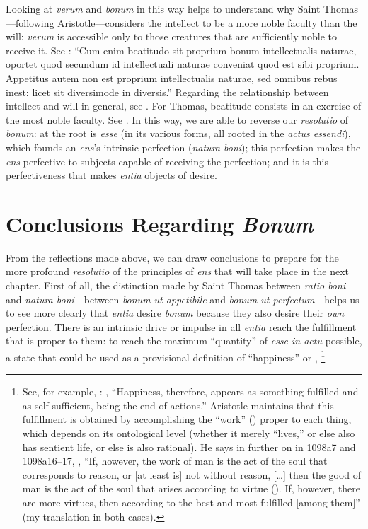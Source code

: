 {{Looking at \emph{verum} and \emph{bonum} in this way helps to understand why Saint Thomas---following Aristotle---considers the intellect to be a more noble faculty than the will: \emph{verum} is accessible only to those creatures that are sufficiently noble to receive it.
See \cite[III, cap.~26, n.~8 (Marietti n.~2078)]{st:contragent}: ``Cum enim beatitudo sit proprium bonum intellectualis naturae, oportet quod secundum id intellectuali naturae conveniat quod est sibi proprium. Appetitus autem non est proprium intellectualis naturae, sed omnibus rebus inest: licet sit diversimode in diversis.''
Regarding the relationship between intellect and will in general, see \cite[I, q.~82, a.~3]{st:summa}. For Thomas, beatitude consists in an exercise of the most noble faculty. See \cite[378--381]{izquierdo:vita}.}
%
In this way, we are able to reverse our \emph{resolutio} of \emph{bonum}: at the root is \emph{esse} (in its various forms, all rooted in the \emph{actus essendi}), which founds an \emph{ens}'s intrinsic perfection (\emph{natura boni}); this perfection makes the \emph{ens} perfective to subjects capable of receiving the perfection; and it is this perfectiveness that makes \emph{entia} objects of desire.

\section{Conclusions Regarding \emph{Bonum}}

From the reflections made above, we can draw conclusions to prepare for the more profound \emph{resolutio} of the principles of \emph{ens} that will take place in the next chapter. First of all, the distinction made by Saint Thomas between \emph{ratio boni} and \emph{natura boni}---between \emph{bonum ut appetibile} and \emph{bonum ut perfectum}---helps us to see more clearly that \emph{entia} desire \emph{bonum} because they also desire their \emph{own} perfection. There is an intrinsic drive or impulse in all \emph{entia} reach the fulfillment that is proper to them: to reach the maximum ``quantity'' of \emph{esse in actu} possible, a state that could be used as a provisional definition of ``happiness'' or ,%
%
\footnote{See, for example, \cite[, 7]{aristotle:ethics}: , ``Happiness, therefore, appears as something fulfilled and as self-sufficient, being the end of actions.'' Aristotle maintains that this fulfillment is obtained by accomplishing the ``work'' () proper to each thing, which depends on its ontological level (whether it merely ``lives,'' or else also has sentient life, or else is also rational).
He says in further on in 1098a7 and 1098a16--17, , ``If, however, the work of man is the act of the soul that corresponds to reason, or [at least is] not without reason, [\ldots] then the good of man is the act of the soul that arises according to virtue (). If, however, there are more virtues, then according to the best and most fulfilled [among them]'' (my translation in both cases).

}}
